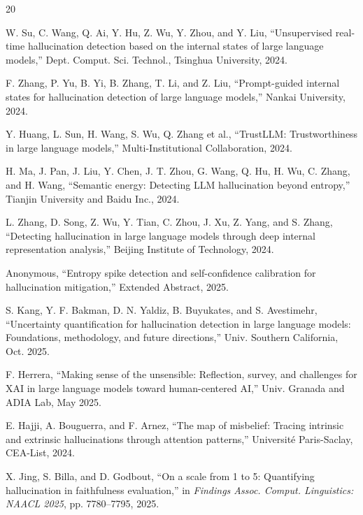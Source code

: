 \documentclass{article}
\begin{document}
\begin{thebibliography}{20}

W. Su, C. Wang, Q. Ai, Y. Hu, Z. Wu, Y. Zhou, and Y. Liu,
``Unsupervised real-time hallucination detection based on the internal states of large language models,''
Dept. Comput. Sci. Technol., Tsinghua University, 2024.

F. Zhang, P. Yu, B. Yi, B. Zhang, T. Li, and Z. Liu,
``Prompt-guided internal states for hallucination detection of large language models,''
Nankai University, 2024.

Y. Huang, L. Sun, H. Wang, S. Wu, Q. Zhang et al.,
``TrustLLM: Trustworthiness in large language models,''
Multi-Institutional Collaboration, 2024.

H. Ma, J. Pan, J. Liu, Y. Chen, J. T. Zhou, G. Wang, Q. Hu, H. Wu, C. Zhang, and H. Wang,
``Semantic energy: Detecting LLM hallucination beyond entropy,''
Tianjin University and Baidu Inc., 2024.

L. Zhang, D. Song, Z. Wu, Y. Tian, C. Zhou, J. Xu, Z. Yang, and S. Zhang,
``Detecting hallucination in large language models through deep internal representation analysis,''
Beijing Institute of Technology, 2024.

Anonymous,
``Entropy spike detection and self-confidence calibration for hallucination mitigation,''
Extended Abstract, 2025.

S. Kang, Y. F. Bakman, D. N. Yaldiz, B. Buyukates, and S. Avestimehr,
``Uncertainty quantification for hallucination detection in large language models: Foundations, methodology, and future directions,''
Univ. Southern California, Oct. 2025.

F. Herrera,
``Making sense of the unsensible: Reflection, survey, and challenges for XAI in large language models toward human-centered AI,''
Univ. Granada and ADIA Lab, May 2025.

E. Hajji, A. Bouguerra, and F. Arnez,
``The map of misbelief: Tracing intrinsic and extrinsic hallucinations through attention patterns,''
Universit\'{e} Paris-Saclay, CEA-List, 2024.

X. Jing, S. Billa, and D. Godbout,
``On a scale from 1 to 5: Quantifying hallucination in faithfulness evaluation,''
in \textit{Findings Assoc. Comput. Linguistics: NAACL 2025}, pp. 7780--7795, 2025.


\end{thebibliography}
\end{document}
